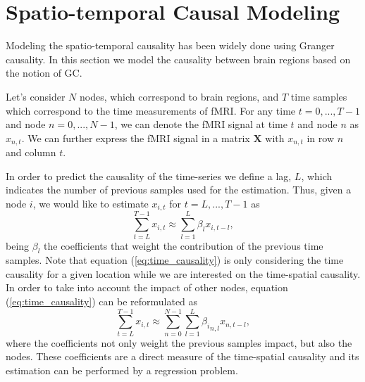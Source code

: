 \documentclass[10pt,conference,compsocconf]{IEEEtran}
\begin{document}
\section{Spatio-temporal Causal Modeling}
\label{sec:Spatio-temporal}
Modeling the spatio-temporal causality has been widely done using Granger causality. In this section we model the causality between brain regions based on the notion of GC. 

Let's consider ${N}$ nodes, which correspond to brain regions, and ${T}$ time samples which correspond to the time measurements of fMRI. For any time  ${t=0,...,T-1}$ and node ${n=0,...,N-1}$, we can denote the fMRI signal at time  ${t}$ and node  ${n}$ as ${x_{n,t}}$. We can further express the fMRI signal in a matrix $\mathbf{X}$ with ${x_{n,t}}$ in row ${n}$ and column ${t}$.

In order to predict the causality of the time-series we define a lag, ${L}$, which indicates the number of previous samples used for the estimation. Thus, given a node ${i}$, we would like to estimate ${x_{i,t}}$ for ${t=L,...,T-1}$ as
\begin{equation}
\sum_{t=L}^{T-1}x_{i,t}	\approx\sum_{l=1}^{L}{\beta_{l}x_{i,t-l}},
\label{eq:time_causality}
\end{equation}
being ${\beta_{l}}$ the coefficients that weight the contribution of the previous time samples. Note that equation (\ref{eq:time_causality}) is only considering the time causality for a given location while we are interested on the time-spatial causality. In order to take into account the impact of other nodes, equation (\ref{eq:time_causality}) can be reformulated as 
\begin{equation}
\sum_{t=L}^{T-1}x_{i,t}	\approx\sum_{n=0}^{N-1}\sum_{l=1}^{L}{{\beta_i}_{n,l}x_{n,t-l}},
\label{eq:time_causality2}
\end{equation}
where the coefficients not only weight the previous samples impact, but also the nodes. These coefficients are a direct measure of the time-spatial causality and its estimation can be performed by a regression problem.
\end{document}
